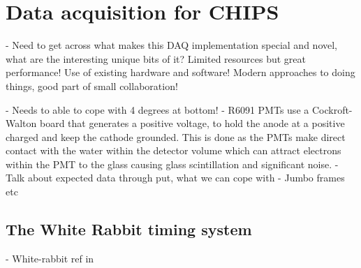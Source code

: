 \chapter{Data acquisition for CHIPS} %
\label{chap:daq} %

- Need to get across what makes this DAQ implementation special and novel, what are the
interesting unique bits of it? Limited resources but great performance! Use of existing hardware
and software! Modern approaches to doing things, good part of small collaboration!

- Needs to able to cope with 4 degrees at bottom!
- R6091 PMTs use a Cockroft-Walton board that generates a positive voltage, to hold the anode at a
positive charged and keep the cathode grounded. This is done as the PMTs make direct contact with
the water within the detector volume which can attract electrons within the PMT to the glass
causing glass scintillation and significant noise.
- Talk about expected data through put, what we can cope with
- Jumbo frames etc

\section{The White Rabbit timing system} %
\label{sec:daq_timing} %

- White-rabbit ref in~\cite{lipinski2011}

